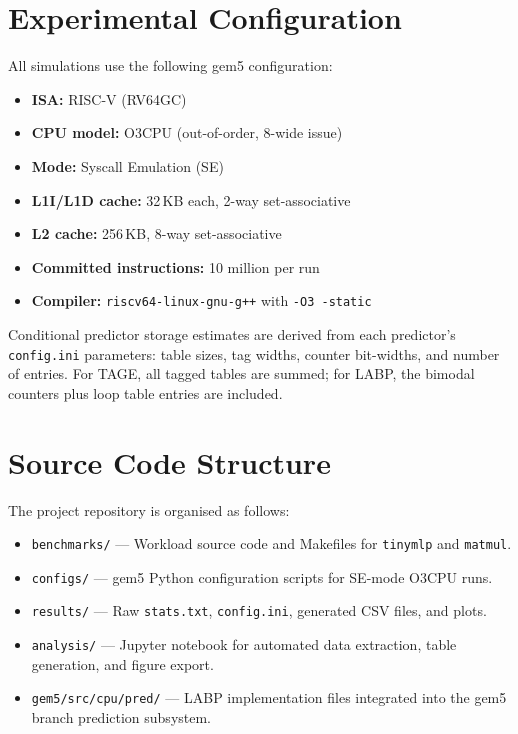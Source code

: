 \documentclass[conference]{IEEEtran}
\begin{document}
\appendix

\section{Experimental Configuration}
\label{app:config}

All simulations use the following gem5 configuration:

\begin{itemize}
    \item \textbf{ISA:} RISC-V (RV64GC)
    \item \textbf{CPU model:} O3CPU (out-of-order, 8-wide issue)
    \item \textbf{Mode:} Syscall Emulation (SE)
    \item \textbf{L1I/L1D cache:} 32\,KB each, 2-way set-associative
    \item \textbf{L2 cache:} 256\,KB, 8-way set-associative
    \item \textbf{Committed instructions:} 10 million per run
    \item \textbf{Compiler:} \texttt{riscv64-linux-gnu-g++} with \texttt{-O3 -static}
\end{itemize}

\noindent Conditional predictor storage estimates are derived from each predictor's \texttt{config.ini} parameters: table sizes, tag widths, counter bit-widths, and number of entries. For TAGE, all tagged tables are summed; for LABP, the bimodal counters plus loop table entries are included.

\section{Source Code Structure}
\label{app:code}

The project repository is organised as follows:

\begin{itemize}
    \item \texttt{benchmarks/} --- Workload source code and Makefiles for \texttt{tinymlp} and \texttt{matmul}.
    \item \texttt{configs/} --- gem5 Python configuration scripts for SE-mode O3CPU runs.
    \item \texttt{results/} --- Raw \texttt{stats.txt}, \texttt{config.ini}, generated CSV files, and plots.
    \item \texttt{analysis/} --- Jupyter notebook for automated data extraction, table generation, and figure export.
    \item \texttt{gem5/src/cpu/pred/} --- LABP implementation files integrated into the gem5 branch prediction subsystem.
\end{itemize}
\end{document}
